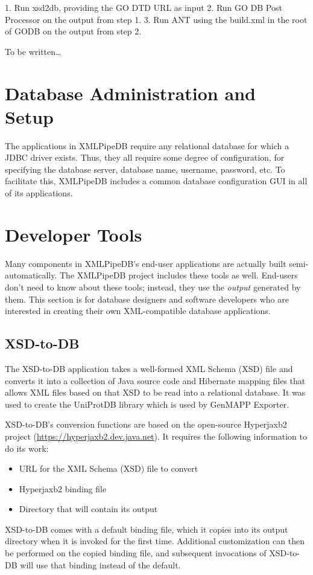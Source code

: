 \documentclass[11pt]{article}
\begin{document}
1. Run xsd2db, providing the GO DTD URL as input
2. Run GO DB Post Processor on the output from step 1.
3. Run ANT using the build.xml in the root of GODB on the output from step 2.



To be written\ldots

\section{Database Administration and Setup}
\label{dbsetup}

The applications in XMLPipeDB require any relational database for which a JDBC driver exists.  Thus, they all require some degree of configuration, for specifying the database server, database name, username, password, etc.  To facilitate this, XMLPipeDB includes a common database configuration GUI in all of its applications.

\section{Developer Tools}
\label{devtools}

Many components in XMLPipeDB's end-user applications are actually built semi-au\-to\-mat\-ic\-al\-ly.  The XMLPipeDB project includes these tools as well.  End-users don't need to know about these tools; instead, they use the \emph{output} generated by them.  This section is for database designers and software developers who are interested in creating their own XML-compatible database applications.

\subsection{XSD-to-DB}

The XSD-to-DB application takes a well-formed XML Schema (XSD) file and converts it into a collection of Java source code and Hibernate mapping files that allows XML files based on that XSD to be read into a relational database.  It was used to create the UniProtDB library which is used by GenMAPP Exporter.

XSD-to-DB's conversion functions are based on the open-source Hyperjaxb2 project (\url{https://hyperjaxb2.dev.java.net}).  It requires the following information to do its work:
\begin{itemize}
\item URL for the XML Schema (XSD) file to convert
\item Hyperjaxb2 binding file
\item Directory that will contain its output
\end{itemize}
XSD-to-DB comes with a default binding file, which it copies into its output directory when it is invoked for the first time.  Additional customization can then be performed on the copied binding file, and subsequent invocations of XSD-to-DB will use that binding instead of the default.
\end{document}
